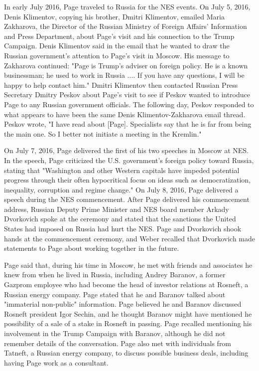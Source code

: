 In early July 2016, Page traveled to Russia for the NES events.
On July 5, 2016, Denis Klimentov, copying his brother, Dmitri Klimentov,%
emailed Maria Zakharova, the Director of the Russian Ministry of Foreign Affairs' Information and Press Department, about Page's visit and his connection to the Trump Campaign.%
Denis Klimentov said in the email that he wanted to draw the Russian government's attention to Page's visit in Moscow.%
His message to Zakharova continued: "Page is Trump's adviser on foreign policy.
He is a known businessman; he used to work in Russia ....
If you have any questions, I will be happy to help contact him."%
Dmitri Klimentov then contacted Russian Press Secretary Dmitry Peskov about Page's visit to see if Peskov wanted to introduce Page to any Russian government officials.%
The following day, Peskov responded to what appears to have been the same Denis Klimentov-Zakharova email thread.
Peskov wrote, "I have read about [Page].
Specialists say that he is far from being the main one.
So I better not initiate a meeting in the Kremlin."%

On July 7, 2016, Page delivered the first of his two speeches in Moscow at NES. %
In the speech, Page criticized the U.S. government's foreign policy toward Russia, stating that "Washington and other Western capitals have impeded potential progress through their often hypocritical focus on ideas such as democratization, inequality, corruption and regime change."%
On July 8, 2016, Page delivered a speech during the NES commencement.%
After Page delivered his commencement address, Russian Deputy Prime Minister and NES board member Arkady Dvorkovich spoke at the ceremony and stated that the sanctions the United States had imposed on Russia had hurt the NES.%
Page and Dvorkovich shook hands at the commencement ceremony, and Weber recalled that Dvorkovich made statements to Page about working together in the future.%

Page said that, during his time in Moscow, he met with friends and associates he knew from when he lived in Russia, including Andrey Baranov, a former Gazprom employee who had become the head of investor relations at Rosneft, a Russian energy company.%
Page stated that he and Baranov talked about "immaterial non-public" information.%
Page believed he and Baranov discussed Rosneft president Igor Sechin, and he thought Baranov might have mentioned he possibility of a sale of a stake in Rosneft in passing.%
Page recalled mentioning his involvement in the Trump Campaign with Baranov, although he did not remember details of the conversation.%
Page also met with individuals from Tatneft, a Russian energy company, to discuss possible business deals, including having Page work as a consultant.%

